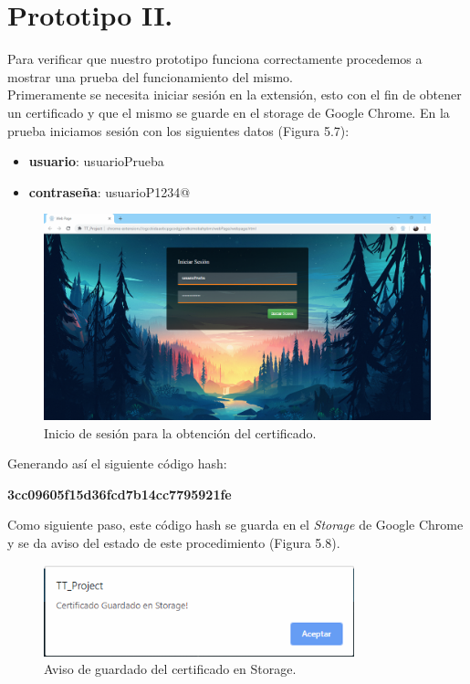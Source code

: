 \documentclass[12pt, a4paper, titlepage]{report}
\begin{document}
    
        \section{Prototipo II.}
            Para verificar que nuestro prototipo funciona correctamente procedemos a mostrar una prueba del funcionamiento del mismo.\\ Primeramente se necesita iniciar sesión en la extensión, esto con el fin de obtener un certificado y que el mismo se guarde en el storage de Google Chrome. En la prueba iniciamos sesión con los siguientes datos (Figura 5.7): 
    
            \begin{itemize}
                \item \textbf{usuario}: usuarioPrueba
                \item \textbf{contraseña}: usuarioP1234@
            \end{itemize}
    
            \begin{figure}[H]
        		\begin{center}	\includegraphics[width=13cm]{./imagenes/Pruebas/Prototipo_2/inicioSesion_prueba.PNG}
        			\caption{Inicio de sesión para la obtención del certificado.}
        		\end{center}
        	\end{figure}
	        Generando así el siguiente código hash:
        	\begin{center}
        	    \textbf{3cc09605f15d36fcd7b14cc7795921fe}
        	\end{center}
        	Como siguiente paso, este código hash se guarda en el \textit{Storage} de Google Chrome y se da aviso del estado de este procedimiento (Figura 5.8).
	
        	\begin{figure}[H]
        		\begin{center}	\includegraphics[width=9cm]{./imagenes/Pruebas/Prototipo_2/certificadoStorage.PNG}
        			\caption{Aviso de guardado del certificado en Storage.}
        		\end{center}
        	\end{figure}
	
\end{document}
